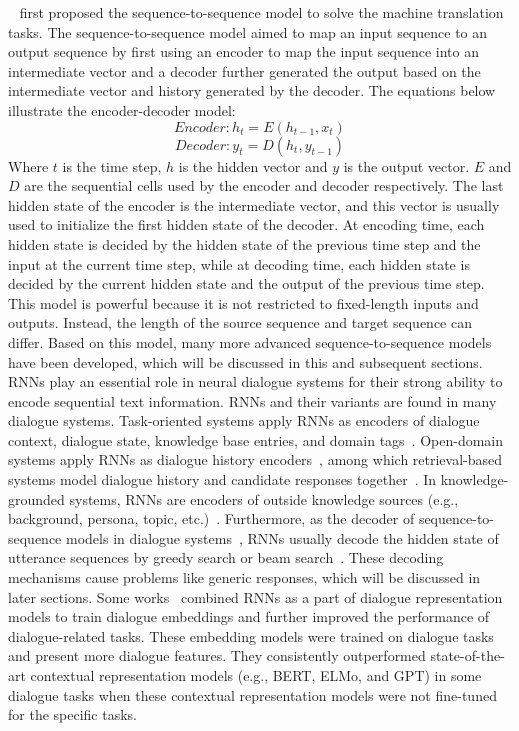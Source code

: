 \label{Vanilla Sequence-to-sequence Models (Encoder-decoder Models)}
~ first proposed the sequence-to-sequence model to solve the machine translation tasks. The sequence-to-sequence model aimed to map an input sequence to an output sequence by first using an encoder to map the input sequence into an intermediate vector and a decoder further generated the output based on the intermediate vector and history generated by the decoder. The equations below illustrate the encoder-decoder model: 
\begin{equation}
Encoder: h_t = E(h_{t-1}, x_{t}) 
\end{equation}
\begin{equation}
Decoder: y_t = D(h_t, y_{t-1})
\end{equation}
Where $t$ is the time step, $h$ is the hidden vector and $y$ is the output vector. $E$ and $D$ are the sequential cells used by the encoder and decoder respectively. The last hidden state of the encoder is the intermediate vector, and this vector is usually used to initialize the first hidden state of the decoder. At encoding time, each hidden state is decided by the hidden state of the previous time step and the input at the current time step, while at decoding time, each hidden state is decided by the current hidden state and the output of the previous time step. 
This model is powerful because it is not restricted to fixed-length inputs and outputs. Instead, the length of the source sequence and target sequence can differ. Based on this model, many more advanced sequence-to-sequence models have been developed, which will be discussed in this and subsequent sections. \\
RNNs play an essential role in neural dialogue systems for their strong ability to encode sequential text information. RNNs and their variants are found in many dialogue systems. Task-oriented systems apply RNNs as encoders of dialogue context, dialogue state, knowledge base entries, and domain tags~. Open-domain systems apply RNNs as dialogue history encoders~, among which retrieval-based systems model dialogue history and candidate responses together~. In knowledge-grounded systems, RNNs are encoders of outside knowledge sources (e.g., background, persona, topic, etc.)~. 
Furthermore, as the decoder of sequence-to-sequence models in dialogue systems~, RNNs usually decode the hidden state of utterance sequences by greedy search or beam search~. These decoding mechanisms cause problems like generic responses, which will be discussed in later sections. 
Some works~ combined RNNs as a part of dialogue representation models to train dialogue embeddings and further improved the performance of dialogue-related tasks. These embedding models were trained on dialogue tasks and present more dialogue features. They consistently outperformed state-of-the-art contextual representation models (e.g., BERT, ELMo, and GPT) in some dialogue tasks when these contextual representation models were not fine-tuned for the specific tasks.

